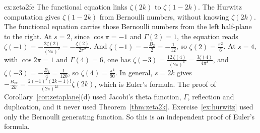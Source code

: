 \begin{solution}{ex:zeta2fe}
\idea The functional equation links $\zeta(2k)$ to $\zeta(1-2k)$. The Hurwitz computation gives $\zeta(1-2k)$ from Bernoulli numbers, without knowing $\zeta(2k)$. The functional equation carries those Bernoulli numbers from the left half-plane to the right.
\writeup At $s=2$, since $\cos\pi=-1$ and $\Gamma(2)=1$, the equation reads $\zeta(-1)=-\frac{2\zeta(2)}{(2\pi)^2}=-\frac{\zeta(2)}{2\pi^2}$. And $\zeta(-1)=-\frac{B_2}2=-\frac1{12}$, so $\zeta(2)=\frac{\pi^2}6$. At $s=4$, with $\cos2\pi=1$ and $\Gamma(4)=6$, one has $\zeta(-3)=\frac{12\,\zeta(4)}{(2\pi)^4}=\frac{3\zeta(4)}{4\pi^4}$, and $\zeta(-3)=-\frac{B_4}4=\frac1{120}$, so $\zeta(4)=\frac{\pi^4}{90}$. In general, $s=2k$ gives $-\frac{B_{2k}}{2k}=\frac{2(-1)^k(2k-1)!}{(2\pi)^{2k}}\zeta(2k)$, which is Euler's formula. The proof of Corollary~\ref{cor:zetaplane}(d) used Jacobi's theta function, $\Gamma$, reflection and duplication, and it never used Theorem~\ref{thm:zeta2k}. Exercise~\ref{ex:hurwitz} used only the Bernoulli generating function. So this is an independent proof of Euler's formula.
\end{solution}


